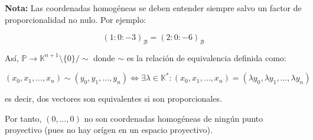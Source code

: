 \textbf{Nota:} Las coordenadas homogéneas se deben entender siempre salvo un factor de proporcionalidad no nulo. Por ejemplo:

\[
    (1 : 0 : -3)_\mathcal{B} = (2 : 0 : -6)_\mathcal{B} 
\]

Así, $\mathbb{P} \to \mathbb{K}^{n+1} \setminus \{0\} / \sim$ donde $\sim$ es la relación de equivalencia definida como:

\[
    (x_0, x_1, \ldots, x_n) \sim (y_0, y_1, \ldots, y_n) \iff \exists \lambda \in \mathbb{K}^* : (x_0, x_1, \ldots, x_n) = (\lambda y_0, \lambda y_1, \ldots, \lambda y_n)
\]

es decir, dos vectores son equivalentes si son proporcionales.

Por tanto, $(0, \ldots, 0)$ no son coordenadas homogéneas de ningún punto proyectivo (pues no hay orígen en un espacio proyectivo).

